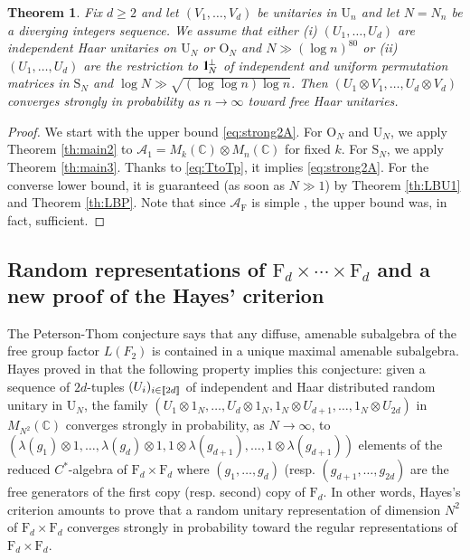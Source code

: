 \documentclass[11pt]{article}
\renewcommand{\star}{{\mathrm{F}}}
\newtheorem{theorem}[lemma]{Theorem}
\newcommand{\cA}{\mathcal{A}}
\newcommand{\dF}{\mathrm{F}}
\newcommand{\dU}{\mathrm {U}}
\newcommand{\dS}{\mathrm{S}}
\newcommand{\dO}{\mathrm{O}}
\newcommand{\dC}{\mathbb {C}}
\newcommand{\1}{1\!\!{\sf I}}
\newcommand{\IND}{\1}
\newcommand{\INT}[1]{{{\left[\hspace{-1.4pt}\left[#1\right]\hspace{-1.4pt}\right]}}}
\begin{document}
\begin{theorem}
Fix $d \geq 2$ and let $(V_{1},\ldots,V_{d})$ be unitaries in $\dU_n$ and let $N = N_n$  be a diverging integers sequence. We assume that either (i) $(U_1,\ldots,  U_d)$ are independent Haar unitaries on $\dU_N$ or $\dO_N$ and $N \gg (\log n)^{80}$ or (ii) $(U_1,\ldots,  U_d)$ are the restriction to $\IND_N^\perp$ of independent and uniform permutation matrices in $\dS_N$ and $\log N  \gg  \sqrt{(\log \log n) \log n}$.
Then $(U_1 \otimes V_1,\ldots, U_d \otimes V_d)$ converges strongly in probability as $n\to \infty$ toward free Haar unitaries.
\end{theorem}
\begin{proof}
We start with the upper bound \eqref{eq:strong2A}. For $\dO_N$ and $\dU_N$, we apply Theorem \ref{th:main2}  to $\cA_1 = M_k (\dC) \otimes M_n(\dC)$ for fixed $k$. For $\dS_N$, we apply Theorem \ref{th:main3}. Thanks to \eqref{eq:TtoTp}, it implies \eqref{eq:strong2A}. For the converse lower bound, it is guaranteed (as soon as $N\gg1$) by Theorem \ref{th:LBU1} and Theorem \ref{th:LBP}. Note that since $\cA_\star$ is simple \cite{MR374334}, the upper bound was, in fact, sufficient.
\end{proof}

\subsection{Random representations of $\dF_d \times \cdots \times \dF_d$ and a new proof of the Hayes' criterion}
\label{subsec:PT}

The Peterson-Thom conjecture \cite{MR2827095} says that any diffuse, amenable subalgebra of the free group factor $L(F_2)$ is contained in a unique maximal amenable subalgebra.  Hayes proved in \cite{MR4448584} that the following property implies this conjecture:
given a sequence of $2d$-tuples  $(U_{i})_{i \in \INT{2d}}$ of independent and Haar distributed random unitary in $\dU_N$, 
the family $(U_{1}\otimes 1_N,\ldots , U_{d}\otimes 1_N,1_N \otimes U_{d+1}
,\ldots , 1_N\otimes U_{2d})$ in $M_{N^2}(\dC)$ converges strongly in probability, as $N\to\infty$, to $(\lambda(g_1) \otimes 1 ,\ldots, \lambda(g_d) \otimes 1,1 \otimes \lambda(g_{d+1}) , \ldots, 1 \otimes \lambda(g_{d+1}))$ elements of the reduced $C^*$-algebra  of $\dF_d\times \dF_d$ where $(g_1,\ldots,g_d)$ (resp. $(g_{d+1},\ldots,g_{2d})$  are the free generators of the first copy (resp. second) copy of $\dF_d$. In other words, Hayes's criterion amounts to prove that a random unitary representation of dimension $N^2$ of $\dF_d \times \dF_d$ converges strongly in probability toward the regular representations of $\dF_d \times \dF_d$.
\end{document}

